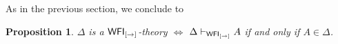 \documentclass[12pt]{article}
\newtheorem{prop}[thm]{Proposition}
\begin{document}
As in the previous section, we conclude to

\begin{prop}
$ \Delta $ is a ${\sf WFI_{[\rightarrow]}}$-theory $ \Longleftrightarrow $ $ \Delta\vdash_{{\sf WFI_{[\rightarrow]}} } A $ if and only if $ A \in \Delta $.
\end{prop}
\end{document}
